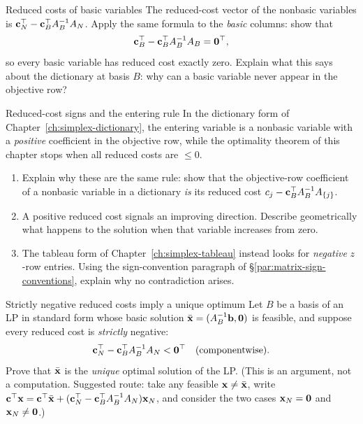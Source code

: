 
\begin{ex}{Reduced costs of basic variables}{}
\label{ex:matrix-basic-reduced-zero}
 The reduced-cost vector of the nonbasic variables is \( \mathbf{c}_N^\top - \mathbf{c}_B^\top A_B^{-1} A_N \).  Apply the same formula to the \emph{basic} columns: show that
\[
\mathbf{c}_B^\top - \mathbf{c}_B^\top A_B^{-1} A_B = \mathbf{0}^\top,
\]
so every basic variable has reduced cost exactly zero.  Explain what this says about the dictionary at basis \( B \): why can a basic variable never appear in the objective row?
\exrefs{\S\ref{sec:optimality-conditions}}
\end{ex}

\begin{ex}{Reduced-cost signs and the entering rule}{}
\label{ex:matrix-sign-conventions}
 In the dictionary form of Chapter~\ref{ch:simplex-dictionary}, the entering variable is a nonbasic variable with a \emph{positive} coefficient in the objective row, while the optimality theorem of this chapter stops when all reduced costs are \( \leq 0 \).
\begin{enumerate}
    \item Explain why these are the same rule: show that the objective-row coefficient of a nonbasic variable in a dictionary \emph{is} its reduced cost \( c_j - \mathbf{c}_B^\top A_B^{-1} A_{\{j\}} \).
    \item A positive reduced cost signals an improving direction.  Describe geometrically what happens to the solution when that variable increases from zero.
    \item The tableau form of Chapter~\ref{ch:simplex-tableau} instead looks for \emph{negative} \( z \)-row entries.  Using the sign-convention paragraph of \S\ref{par:matrix-sign-conventions}, explain why no contradiction arises.
\end{enumerate}
\end{ex}


\begin{ex}{Strictly negative reduced costs imply a unique optimum}{}
\label{ex:matrix-unique-optimum}
 Let \( B \) be a basis of an LP in standard form whose basic solution \( \bar{\mathbf{x}} = (A_B^{-1}\mathbf{b}, \mathbf{0}) \) is feasible, and suppose every reduced cost is \emph{strictly} negative:
\[
\mathbf{c}_N^\top - \mathbf{c}_B^\top A_B^{-1} A_N < \mathbf{0}^\top \quad \text{(componentwise)}.
\]
Prove that \( \bar{\mathbf{x}} \) is the \emph{unique} optimal solution of the LP.  (This is an argument, not a computation.  Suggested route: take any feasible \( \mathbf{x} \neq \bar{\mathbf{x}} \), write \( \mathbf{c}^\top \mathbf{x} = \mathbf{c}^\top \bar{\mathbf{x}} + (\mathbf{c}_N^\top - \mathbf{c}_B^\top A_B^{-1} A_N)\mathbf{x}_N \), and consider the two cases \( \mathbf{x}_N = \mathbf{0} \) and \( \mathbf{x}_N \neq \mathbf{0} \).)
\end{ex}

